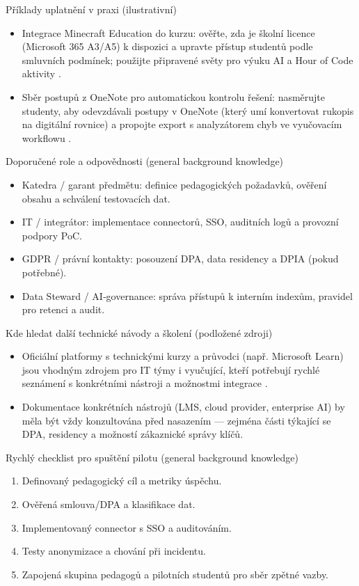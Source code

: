 \documentclass{report}%
\begin{document}
Příklady uplatnění v praxi (ilustrativní)
\begin{itemize}
  \item Integrace Minecraft Education do kurzu: ověřte, zda je školní licence (Microsoft 365 A3/A5) k dispozici a upravte přístup studentů podle smluvních podmínek; použijte připravené světy pro výuku AI a Hour of Code aktivity \cite{kb_ai_101_tipu_pdf_04e4a115_page_15_2}.
  \item Sběr postupů z OneNote pro automatickou kontrolu řešení: nasměrujte studenty, aby odevzdávali postupy v OneNote (který umí konvertovat rukopis na digitální rovnice) a propojte export s analyzátorem chyb ve vyučovacím workflowu \cite{kb_ai_101_tipu_pdf_04e4a115_page_8_1}.
\end{itemize}

Doporučené role a odpovědnosti (general background knowledge)
\begin{itemize}
  \item Katedra / garant předmětu: definice pedagogických požadavků, ověření obsahu a schválení testovacích dat.
  \item IT / integrátor: implementace connectorů, SSO, auditních logů a provozní podpory PoC.
  \item GDPR / právní kontakty: posouzení DPA, data residency a DPIA (pokud potřebné).
  \item Data Steward / AI‑governance: správa přístupů k interním indexům, pravidel pro retenci a audit.
\end{itemize}

Kde hledat další technické návody a školení (podložené zdroji)
\begin{itemize}
  \item Oficiální platformy s technickými kurzy a průvodci (např. Microsoft Learn) jsou vhodným zdrojem pro IT týmy i vyučující, kteří potřebují rychlé seznámení s konkrétními nástroji a možnostmi integrace \cite{kb_ai_101_tipu_pdf_04e4a115_page_54_1}.
  \item Dokumentace konkrétních nástrojů (LMS, cloud provider, enterprise AI) by měla být vždy konzultována před nasazením — zejména části týkající se DPA, residency a možností zákaznické správy klíčů.
\end{itemize}

Rychlý checklist pro spuštění pilotu (general background knowledge)
\begin{enumerate}
  \item Definovaný pedagogický cíl a metriky úspěchu.
  \item Ověřená smlouva/DPA a klasifikace dat.
  \item Implementovaný connector s SSO a auditováním.
  \item Testy anonymizace a chování při incidentu.
  \item Zapojená skupina pedagogů a pilotních studentů pro sběr zpětné vazby.
\end{enumerate}
\end{document}
